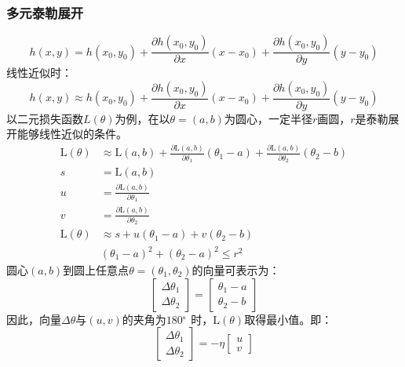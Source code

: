 \subsubsection{多元泰勒展开}
\[
h ( x , y ) = h \left( x _ { 0 } , y _ { 0 } \right) + \frac { \partial h \left( x _ { 0 } , y _ { 0 } \right) } { \partial x } \left( x - x _ { 0 } \right) + \frac { \partial h \left( x _ { 0 } , y _ { 0 } \right) } { \partial y } \left( y - y _ { 0 } \right)
\]
线性近似时：
\[
h ( x , y ) \approx h \left( x _ { 0 } , y _ { 0 } \right) + \frac { \partial h \left( x _ { 0 } , y _ { 0 } \right) } { \partial x } \left( x - x _ { 0 } \right) + \frac { \partial h \left( x _ { 0 } , y _ { 0 } \right) } { \partial y } \left( y - y _ { 0 } \right)
\]
以二元损失函数$L(\theta)$为例，在以$\theta=(a,b)$为圆心，一定半径$r$画圆，$r$是泰勒展开能够线性近似的条件。
\begin{align}
\mathrm { L } ( \theta ) &\approx \mathrm { L } ( a , b ) + \frac { \partial \mathrm { L } ( a , b ) } { \partial \theta _ { 1 } } \left( \theta _ { 1 } - a \right) + \frac { \partial \mathrm { L } ( a , b ) } { \partial \theta _ { 2 } } \left( \theta _ { 2 } - b \right)\\
s &= \mathrm { L } ( a , b )\\
u &= \frac { \partial \mathrm { L } ( a , b ) } { \partial \theta _ { 1 } }\\
v &= \frac { \partial \mathrm { L } ( a , b ) } { \partial \theta _ { 2 } }\\
\mathrm { L } ( \theta ) &\approx s + u(\theta_1-a) + v(\theta_2-b)\\
&(\theta_1-a)^2+(\theta_2-a)^2 \leq r^2
\end{align}
圆心$(a,b)$到圆上任意点$\theta=(\theta_1,\theta_2)$的向量可表示为：
\[
\left[ \begin{array} { l } { \Delta \theta _ { 1 } } \\ { \Delta \theta _ { 2 } } \end{array} \right] = 
\left[ \begin{array} { l }  \theta_1 -a \\  \theta_2 - b  \end{array} \right]
\]
因此，向量$\Delta \theta$与$(u,v)$的夹角为$180^。$时，$\mathrm { L } ( \theta )$取得最小值。即：
\[
\left[ \begin{array} { l } { \Delta \theta _ { 1 } } \\ { \Delta \theta _ { 2 } } \end{array} \right] = 
-\eta \left[ \begin{array} { l }  u \\  v  \end{array} \right]
\]
